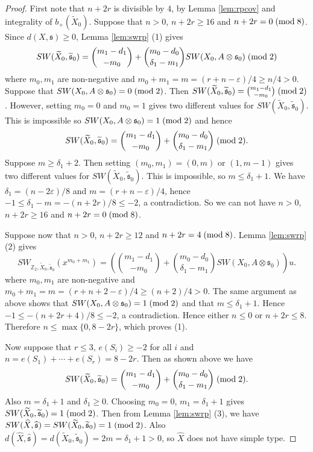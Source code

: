 \documentclass{amsart}
\theoremstyle{definition}
\theoremstyle{remark}
\numberwithin{equation}{section}
\begin{document}
\begin{proof}
First note that $n+2r$ is divisible by $4$, by Lemma \ref{lem:rpcov} and integrality of $b_+(\widetilde{X}_0)$. Suppose that $n > 0$, $n+2r \ge 16$ and $n+2r = 0 \; ({\rm mod} \; 8)$. Since $d(X , \mathfrak{s}) \ge 0$, Lemma \ref{lem:swrp} (1) gives
\[
SW(\widetilde{X}_0 , \widetilde{\mathfrak{s}}_0) = \binom{m_1-d_1}{-m_0} + \binom{m_0-d_0}{\delta_1 - m_1}SW(X_0 , A \otimes \mathfrak{s}_0) \; ({\rm mod} \; 2)
\]
where $m_0,m_1$ are non-negative and $m_0 + m_1 = m = (r+n-\varepsilon)/4 \ge n/4 > 0$. Suppose that $SW(X_0 , A \otimes \mathfrak{s}_0) = 0 \; ({\rm mod} \; 2)$. Then $SW(\widetilde{X}_0 , \widetilde{\mathfrak{s}}_0) = \binom{m_1-d_1}{-m_0} \; ({\rm mod} \; 2)$. However, setting $m_0 = 0$ and $m_0 = 1$ gives two different values for $SW(\widetilde{X}_0 , \widetilde{\mathfrak{s}}_0)$. This is impossible so $SW(X_0 , A \otimes \mathfrak{s}_0)  = 1 \; ({\rm mod} \; 2)$ and hence
\[
SW(\widetilde{X}_0 , \widetilde{\mathfrak{s}}_0) = \binom{m_1-d_1}{-m_0} + \binom{m_0-d_0}{\delta_1 - m_1} \; ({\rm mod} \; 2).
\]
Suppose $m \ge \delta_1 + 2$. Then setting $(m_0 , m_1) = (0, m)$ or $(1,m-1)$ gives two different values for $SW(\widetilde{X}_0 , \widetilde{\mathfrak{s}}_0)$. This is impossible, so $m \le \delta_1 + 1$. We have $\delta_1 = (n - 2\varepsilon)/8$ and $m =  (r+n-\varepsilon)/4$, hence $-1 \le \delta_1 - m = -(n+2r)/8 \le -2$, a contradiction. So we can not have $n>0$, $n+2r \ge 16$ and $n+2r = 0 \; ({\rm mod} \; 8)$.

Suppose now that $n > 0$, $n+2r \ge 12$ and $n+2r = 4 \; ({\rm mod} \; 8)$. Lemma \ref{lem:swrp} (2) gives
\[
SW_{\mathbb{Z}_2 , \widetilde{X}_0 , \widetilde{\mathfrak{s}}_0}( x^{m_0+m_1} ) = \left( \binom{m_1-d_1}{-m_0} + \binom{m_0-d_0}{\delta_1 - m_1}SW(X_0 , A \otimes \mathfrak{s}_0) \right)u.
\]
where $m_0,m_1$ are non-negative and $m_0 + m_1 = m = (r+n+2-\varepsilon)/4 \ge (n+2)/4 > 0$. The same argument as above shows that $SW(X_0 , A \otimes \mathfrak{s}_0) = 1 \; ({\rm mod} \; 2)$ and that $m \le \delta_1 + 1$. Hence $-1 \le -(n+2r+4)/8 \le -2$, a contradiction. Hence either $n \le 0$ or $n+2r \le 8$. Therefore $n \le \max\{ 0 , 8-2r\}$, which proves (1).

Now suppose that $r \le 3$, $e(S_i) \ge -2$ for all $i$ and $n = e(S_1) + \cdots + e(S_r) = 8-2r$. Then as shown above we have
\[
SW(\widetilde{X}_0 , \widetilde{\mathfrak{s}}_0) = \binom{m_1-d_1}{-m_0} + \binom{m_0-d_0}{\delta_1 - m_1} \; ({\rm mod} \; 2).
\]
Also $m = \delta_1 + 1$ and $\delta_1 \ge 0$. Choosing $m_0=0$, $m_1 = \delta_1+1$ gives $SW(\widetilde{X}_0 , \widetilde{\mathfrak{s}}_0) = 1 \; ({\rm mod} \; 2)$. Then from Lemma \ref{lem:swrp} (3), we have $SW(\widehat{X} , \widehat{\mathfrak{s}}) = SW(\widetilde{X}_0 , \widetilde{\mathfrak{s}}_0) = 1 \; ({\rm mod} \; 2)$. Also $d(\widehat{X} , \widehat{\mathfrak{s}}) = d(\widetilde{X}_0 , \widetilde{\mathfrak{s}}_0) = 2m = \delta_1 + 1 > 0$, so $\widehat{X}$ does not have simple type.
\end{proof}
\end{document}
